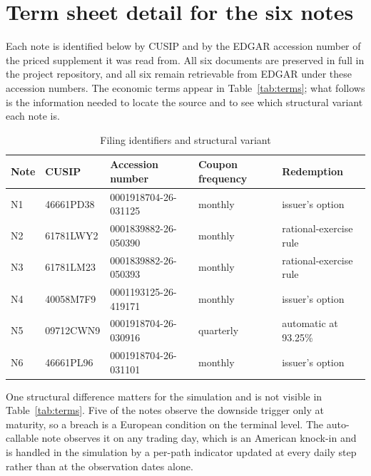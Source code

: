 \section{Term sheet detail for the six notes}\label{app:terms}

Each note is identified below by CUSIP and by the EDGAR accession number of the
priced supplement it was read from. All six documents are preserved in full in
the project repository, and all six remain retrievable from EDGAR under these
accession numbers. The economic terms appear in Table~\ref{tab:terms}; what
follows is the information needed to locate the source and to see which
structural variant each note is.

\begin{table}[htbp]
\centering
\caption{Filing identifiers and structural variant}
\label{tab:filings}
\small
\begin{tabular}{l l l l l}
\toprule
Note & CUSIP & Accession number & Coupon frequency & Redemption \\
\midrule
N1 & 46661PD38 & 0001918704-26-031125 & monthly   & issuer's option \\
N2 & 61781LWY2 & 0001839882-26-050390 & monthly   & rational-exercise rule \\
N3 & 61781LM23 & 0001839882-26-050393 & monthly   & rational-exercise rule \\
N4 & 40058M7F9 & 0001193125-26-419171 & monthly   & issuer's option \\
N5 & 09712CWN9 & 0001918704-26-030916 & quarterly & automatic at 93.25\% \\
N6 & 46661PL96 & 0001918704-26-031101 & monthly   & issuer's option \\
\bottomrule
\end{tabular}
\end{table}

One structural difference matters for the simulation and is not visible in
Table~\ref{tab:terms}. Five of the notes observe the downside trigger only at
maturity, so a breach is a European condition on the terminal level. The
auto-callable note observes it on any trading day, which is an American
knock-in and is handled in the simulation by a per-path indicator updated at
every daily step rather than at the observation dates alone.
